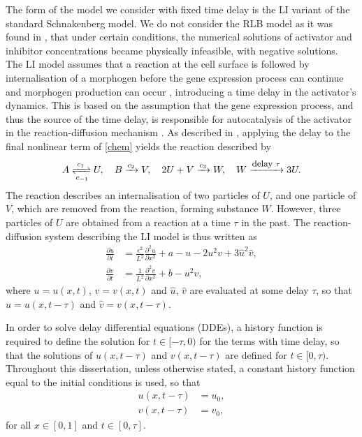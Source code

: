 The form of the model we consider with fixed time delay is the LI variant of the standard Schnakenberg model. We do not consider the RLB model as it was found in \cite{william}, that under certain conditions, the numerical solutions of activator and inhibitor concentrations became physically infeasible, with negative solutions. The LI model assumes that a reaction at the cell surface is followed by internalisation of a morphogen before the gene expression process can continue and morphogen production can occur \cite{leegaffney,yigaffneyli}, introducing a time delay in the activator's dynamics.  This is based on the assumption that the gene expression process, and thus the source of the time delay, is responsible for autocatalysis of the activator in the reaction-diffusion mechanism \cite{gaffmonk}. As described in \cite{baker}, applying the delay to the final nonlinear term of \eqref{chem} yields the reaction described by
\begin{equation}\label{chem2}
A\xrightleftharpoons[c_{-1}]{c_1} U,\quad B\xrightarrow{c_2} V,\quad 2U+V\xrightarrow{c_3} W,\quad W\xrightarrow{\text{\footnotesize delay } \tau}3U.
\end{equation}
The reaction describes an internalisation of two particles of $U$, and one particle of $V$, which are removed from the reaction, forming substance $W$. However, three particles of $U$ are obtained from a reaction at a time $\tau$ in the past. The reaction-diffusion system describing the LI model is thus written as \cite{leegaffney}
\begin{equation}\label{fixed}
  \begin{split}
  \frac{\partial u}{\partial t}&=\frac{\epsilon^2}{L^2}\frac{\partial^2u}{\partial x^2}+a-u-2u^2v+3\hat{u}^2\hat{v},\\
  \frac{\partial v}{\partial t}&=\frac{1}{L^2}\frac{\partial^2v}{\partial x^2}+b-u^2v,
\end{split}
\end{equation}
where $u=u(x,t)$, $v=v(x,t)$ and $\hat{u}$, $\hat{v}$ are evaluated at some delay $\tau$, so that $\hat{u}=u(x,t-\tau)$ and $\hat{v}=v(x,t-\tau)$.

In order to solve delay differential equations (DDEs), a history function is required to define the solution for $t\in[-\tau,0)$ for the terms with time delay, so that the solutions of $u(x,t-\tau)$ and $v(x,t-\tau)$ are defined for $t\in[0,\tau)$. Throughout this dissertation, unless otherwise stated, a constant history function equal to the initial conditions is used, so that
\begin{align*}
u(x,t-\tau)&=u_0,\\
v(x,t-\tau)&=v_0,
\end{align*}
for all $x\in[0, 1]$ and $t\in[0,\tau]$.

